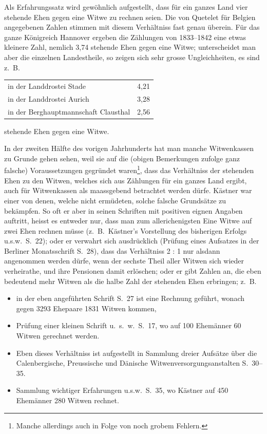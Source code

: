 \documentclass[12pt,a4paper]{article}
\begin{document}
Als Erfahrungssatz wird gew\"ohnlich aufgestellt, dass f\"ur ein ganzes Land vier stehende Ehen gegen eine Witwe zu rechnen seien. Die von Quetelet f\"ur Belgien angegebenen Zahlen stimmen mit diesem Verh\"altniss fast genau \"uberein. F\"ur das ganze K\"onigreich Hannover ergeben die Z\"ahlungen von 1833--1842 eine etwas kleinere Zahl, nemlich 3,74 stehende Ehen gegen eine Witwe; unterscheidet man aber die einzelnen Landestheile, so zeigen sich sehr grosse Ungleichheiten, es sind z.\ B.

\begin{center}
\begin{tabular}{l@{\quad\dots\quad}r}
in der Landdrostei Stade & 4,21 \\
in der Landdrostei Aurich & 3,28 \\
in der Berghauptmannschaft Clausthal & 2,56
\end{tabular}
\end{center}

stehende Ehen gegen eine Witwe.

In der zweiten H\"alfte des vorigen Jahrhunderts hat man manche Witwenkassen zu Grunde gehen sehen, weil sie auf die (obigen Bemerkungen zufolge ganz falsche) Voraussetzungen gegr\"undet waren\footnote{Manche allerdings auch in Folge von noch grobem Fehlern.}, dass das Verh\"altniss der stehenden Ehen zu den Witwen, welches sich aus Z\"ahlungen f\"ur ein ganzes Land ergibt, auch f\"ur Witwenkassen als maassgebend betrachtet werden d\"urfe. K\"astner war einer von denen, welche nicht erm\"udeten, solche falsche Grunds\"atze zu bek\"ampfen. So oft er aber in seinen Schriften mit positiven eignen Angaben auftritt, heisst es entweder nur, dass man zum allerichenigsten Eine Witwe auf zwei Ehen rechnen m\"usse (z.\ B.\ K\"astner's Vorstellung des bisherigen Erfolgs u.s.w.\ S.\ 22); oder er verwahrt sich ausdr\"ucklich (Pr\"ufung eines Aufsatzes in der Berliner Monatsschrift S.\ 28), dass das Verh\"altniss 2 : 1 nur alsdann angenommen werden d\"urfe, wenn der sechste Theil aller Witwen sich wieder verheirathe, und ihre Pensionen damit erl\"oschen; oder er gibt Zahlen an, die eben bedeutend mehr Witwen als die halbe Zahl der stehenden Ehen erbringen; z.\ B.

\begin{itemize}
\item[] in der eben angef\"uhrten Schrift S.\ 27 ist eine Rechnung gef\"uhrt, wonach gegen 3293 Ehepaare 1831 Witwen kommen,
\item[] Pr\"ufung einer kleinen Schrift u.\ s.\ w.\ S.\ 17, wo auf 100 Ehem\"anner 60 Witwen gerechnet werden.
\item[] Eben dieses Verh\"altniss ist aufgestellt in Sammlung dreier Aufs\"atze \"uber die Calenbergische, Preussische und D\"anische Witwenversorgungsanstalten S.\ 30--35.
\item[] Sammlung wichtiger Erfahrungen u.s.w.\ S.\ 35, wo K\"astner auf 450 Ehem\"anner 280 Witwen rechnet.
\end{itemize}
\end{document}
